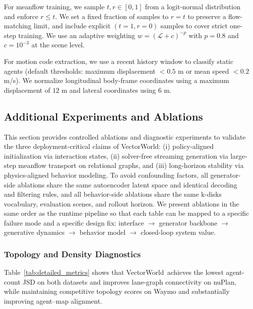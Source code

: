 \documentclass{article}
\newcommand{\VectorWorld}{VectorWorld}
\theoremstyle{plain}
\theoremstyle{definition}
\theoremstyle{remark}
\begin{document}
For meanflow training, we sample \(t,r\in[0,1]\) from a logit-normal distribution and enforce \(r\le t\). We set a fixed fraction of
samples to \(r=t\) to preserve a flow-matching limit, and include explicit \((t=1,r=0)\) samples to cover strict one-step training.
We use an adaptive weighting \(w=(\mathcal{L}+c)^{-p}\) with \(p=0.8\) and \(c=10^{-3}\) at the scene level.

For motion code extraction, we use a recent history window to classify static agents (default thresholds: maximum displacement \(<0.5\) m
or mean speed \(<0.2\) m/s). We normalize longitudinal body-frame coordinates using a maximum displacement of \(12\) m and lateral
coordinates using \(6\) m.


\subsection{Additional Experiments and Ablations}
\label{app:extraexp}

This section provides controlled ablations and diagnostic experiments to validate the three deployment-critical claims of VectorWorld:
(i) policy-aligned initialization via interaction states, (ii) solver-free streaming generation via large-step meanflow transport on relational graphs,
and (iii) long-horizon stability via physics-aligned behavior modeling.
To avoid confounding factors, all generator-side ablations share the same autoencoder latent space and identical decoding and filtering rules,
and all behavior-side ablations share the same k-disks vocabulary, evaluation scenes, and rollout horizon.
We present ablations in the same order as the runtime pipeline so that each table can be mapped to a specific failure mode and a specific design fix:
interface \(\rightarrow\) generator backbone \(\rightarrow\) generative dynamics \(\rightarrow\) behavior model \(\rightarrow\) closed-loop system value.

\subsubsection{Topology and Density Diagnostics}
Table~\ref{tab:detailed_metrics} shows that \VectorWorld\ achieves the lowest agent-count JSD on both datasets and improves lane-graph connectivity on nuPlan, while maintaining competitive topology scores on Waymo and substantially improving agent--map alignment.
\end{document}
